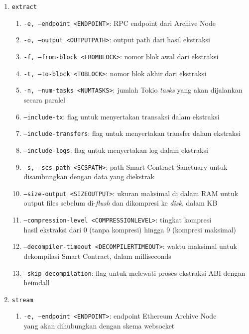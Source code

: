 \begin{enumerate}
    \item \texttt{extract}
    \begin{enumerate}
        \item \texttt{-e, --endpoint <ENDPOINT>}: RPC endpoint dari Archive Node
        \item \texttt{-o, --output <OUTPUT\textunderscore PATH>}: output path dari hasil ekstraksi
        \item \texttt{-f, --from-block <FROM\textunderscore BLOCK>}: nomor blok awal dari ekstraksi
        \item \texttt{-t, --to-block <TO\textunderscore BLOCK>}: nomor blok akhir dari ekstraksi
        \item \texttt{-n, --num-tasks <NUM\textunderscore TASKS>}: jumlah Tokio \textit{tasks} yang akan dijalankan secara paralel
        \item \texttt{--include-tx}: flag untuk menyertakan transaksi dalam ekstraksi
        \item \texttt{--include-transfers}: flag untuk menyertakan transfer dalam ekstraksi
        \item \texttt{--include-logs}: flag untuk menyertakan log dalam ekstraksi
        \item \texttt{-s, --scs-path <SCS\textunderscore PATH>}: path Smart Contract Sanctuary untuk disambungkan dengan data yang diekstrak
        \item \texttt{--size-output <SIZE\textunderscore OUTPUT>}: ukuran maksimal di dalam RAM untuk output files sebelum di-\textit{flush} dan dikompresi ke \textit{disk}, dalam KB
        \item \texttt{--compression-level <COMPRESSION\textunderscore LEVEL>}: tingkat kompresi \\hasil ekstraksi dari 0 (tanpa kompresi) hingga 9 (kompresi maksimal)
        \item \texttt{--decompiler-timeout <DECOMPILER\textunderscore TIMEOUT>}: waktu maksimal untuk dekompilasi Smart Contract, dalam milliseconds
        \item \texttt{--skip-decompilation}: flag untuk melewati proses ekstraksi ABI dengan heimdall
    \end{enumerate}
    \item \texttt{stream}
    \begin{enumerate}
        \item \texttt{-e, --endpoint <ENDPOINT>}: endpoint Ethereum Archive Node \\yang akan dihubungkan dengan skema websocket

\end{enumerate}
\end{enumerate}
